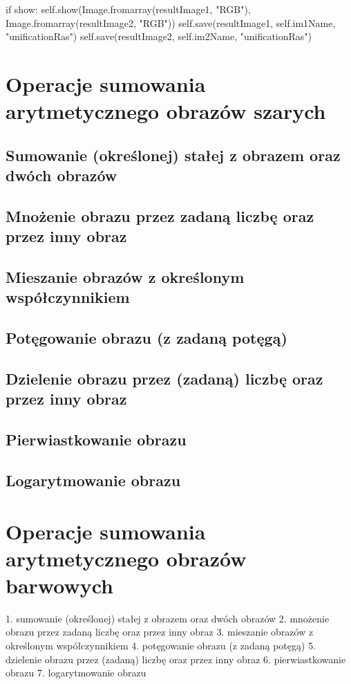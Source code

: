 \documentclass[final,a4paper,openany,12pt]{mwbk}
\begin{document}
\indent \indent if show: \newline
\indent \indent self.show(Image.fromarray(resultImage1, "RGB"), Image.fromarray(resultImage2, "RGB")) \newline
\indent \indent self.save(resultImage1, self.im1Name, "unificationRas") \newline
\indent \indent self.save(resultImage2, self.im2Name, "unificationRas") \newline










\chapter{Operacje sumowania arytmetycznego obrazów szarych}
\section {Sumowanie (określonej) stałej z obrazem oraz dwóch obrazów}
\section {Mnożenie obrazu przez zadaną liczbę oraz przez inny obraz}
\section {Mieszanie obrazów z określonym współczynnikiem}
\section {Potęgowanie obrazu (z zadaną potęgą)}
\section {Dzielenie obrazu przez (zadaną) liczbę oraz przez inny obraz}
\section {Pierwiastkowanie obrazu}
\section {Logarytmowanie obrazu}

\chapter{Operacje sumowania arytmetycznego obrazów barwowych}
1. sumowanie (określonej) stałej z obrazem oraz dwóch obrazów
2. mnożenie obrazu przez zadaną liczbę oraz przez inny obraz
3. mieszanie obrazów z określonym współczynnikiem
4. potęgowanie obrazu (z zadaną potęgą)
5. dzielenie obrazu przez (zadaną) liczbę oraz przez inny obraz
6. pierwiastkowanie obrazu
7. logarytmowanie obrazu
\end{document}
